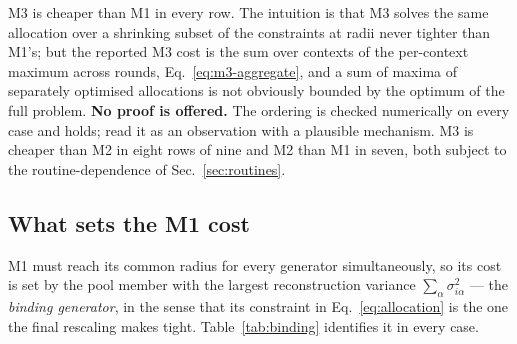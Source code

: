\documentclass[10pt]{article}
\begin{document}
M3 is cheaper than M1 in every row. The intuition is that M3 solves the same
allocation over a shrinking subset of the constraints at radii never tighter than
M1's; but the reported M3 cost is the sum over contexts of the per-context
maximum across rounds, Eq.~\eqref{eq:m3-aggregate}, and a sum of maxima of
separately optimised allocations is not obviously bounded by the optimum of the
full problem. \textbf{No proof is offered.} The ordering is checked numerically
on every case and holds; read it as an observation with a plausible mechanism.
M3 is cheaper than M2 in eight rows of nine and M2 than M1 in seven, both subject
to the routine-dependence of Sec.~\ref{sec:routines}.

\subsection{What sets the M1 cost}
\label{sec:m1-cost}

M1 must reach its common radius for every generator simultaneously, so its cost is set by the pool member with the largest reconstruction variance $\sum_\alpha\sigma_{i\alpha}^2$ --- the \emph{binding generator}, in the sense that its constraint in Eq.~\eqref{eq:allocation} is the one the final rescaling makes tight. Table~\ref{tab:binding} identifies it in every case.
\end{document}

